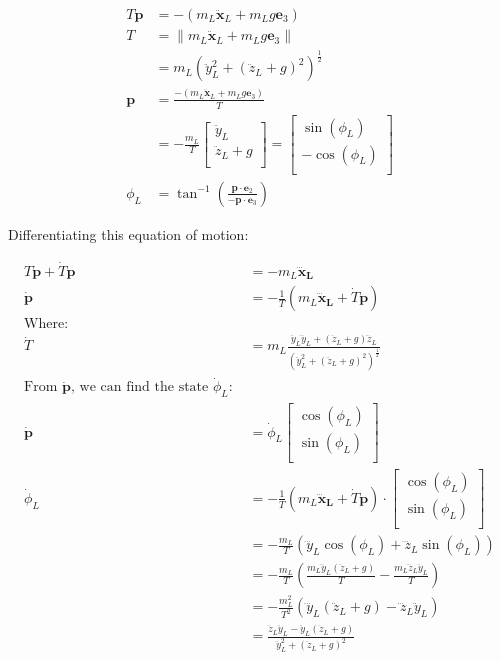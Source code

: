 \documentclass[11pt]{article}
\begin{document}
\begin{align*}
T \mathbf{p} &= - (m_L \mathbf{\ddot{x}}_L + m_L g \mathbf{e}_3) \\
T &= \| m_L \mathbf{\ddot{x}}_L + m_L g \mathbf{e}_3 \| \\
&= m_L ( \ddot{y}_L^2 + ( \ddot{z}_L + g)^2 ) ^{\frac{1}{2}} \\
\mathbf{p} &=  \frac{ - (m_L \mathbf{\ddot{x}}_L + m_L g \mathbf{e}_3) } { T } \\ 
&= - \frac{m_L}{T} 
\begin{bmatrix}
      \ddot{y}_L \\
      \ddot{z}_L + g \\
\end{bmatrix} 
= 
\begin{bmatrix}
       \sin(\phi_L) \\
       - \cos(\phi_L) \\
\end{bmatrix} \\
\phi_L &= \tan^{-1} \left( \frac{ \mathbf{p} \cdot \mathbf{e}_2 } { - \mathbf{p} \cdot \mathbf{e}_3 } \right)
\end{align*}

Differentiating this equation of motion: 

\begin{align*}
T \mathbf{\dot{p}} + \dot{T} \mathbf{p} &= -m_L \mathbf{\dddot{x}_L} \\
\mathbf{\dot{p}} &= - \frac{1}{T} (m_L \mathbf{\dddot{x}_L} + \dot{T} \mathbf{p} ) \\
\text{Where:} & \\
\dot{T} &= m_L \frac{ \ddot{y}_L \dddot{y}_L + (\ddot{z}_L + g) \dddot{z}_L } { ( \ddot{y}_L^2 + (\ddot{z}_L + g)^2 ) ^{\frac{1}{2}} } \\
\text{From $\mathbf{\dot{p}}$, we can find the state $\dot{\phi}_L$: } & \\
\mathbf{\dot{p}} &=  \dot{\phi}_L 
\begin{bmatrix}
       \cos(\phi_L) \\
       \sin(\phi_L) \\
\end{bmatrix} \\
\dot{\phi}_L &= - \frac{1}{T} (m_L \mathbf{\dddot{x}_L} + \dot{T} \mathbf{p} ) \cdot
\begin{bmatrix}
       \cos(\phi_L) \\
       \sin(\phi_L) \\
\end{bmatrix} \\ 
&= - \frac{m_L} {T} ( \dddot{y}_L \cos(\phi_L) + \dddot{z}_L \sin(\phi_L) ) \\
&= - \frac{m_L}{T} ( \frac{ m_L \dddot{y}_L (\ddot{z}_L + g) } {T} - \frac{ m_L \dddot{z}_L \ddot{y}_L }{T} ) \\
&= - \frac{ m_L^2 }{T^2} ( \dddot{y}_L (\ddot{z}_L + g) - \dddot{z}_L \ddot{y}_L ) \\
&= \frac{ \ddot{z}_L \ddot{y}_L - \ddot{y}_L (\ddot{z}_L + g) } { \ddot{y}_L^2 + (\ddot{z}_L+g)^2 }
\end{align*}
\end{document}
